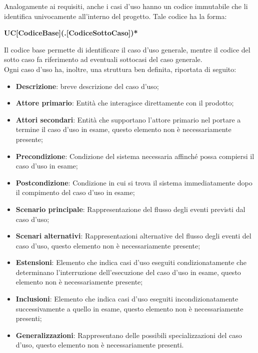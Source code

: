 Analogamente ai requisiti, anche i casi d'uso hanno un codice immutabile che li identifica univocamente all'interno del progetto. Tale codice ha la forma:
\begin{center}
    \textbf{UC[CodiceBase](.[CodiceSottoCaso])*}
\end{center}
Il codice base permette di identificare il caso d'uso generale, mentre il codice del sotto caso fa riferimento ad eventuali sottocasi del caso generale.\\
Ogni caso d'uso ha, inoltre, una struttura ben definita, riportata di seguito:
\begin{itemize}
    \item \textbf{Descrizione}: breve descrizione del caso d'uso;
    \item \textbf{Attore primario}: Entità che interagisce direttamente con il prodotto;
    \item \textbf{Attori secondari}: Entità che supportano l'attore primario nel portare a termine il caso d'uso in 
    esame, questo elemento non è necessariamente presente;
    \item \textbf{Precondizione}: Condizione del sistema necessaria affinché possa compiersi il caso d'uso in esame;
    \item \textbf{Postcondizione}: Condizione in cui si trova il sistema immediatamente dopo il compimento del caso 
    d'uso in esame;
    \item \textbf{Scenario principale}: Rappresentazione del flusso degli eventi previsti dal caso d'uso;
    \item \textbf{Scenari alternativi}: Rappresentazioni alternative del flusso degli eventi del caso d'uso, questo 
    elemento non è necessariamente presente;
    \item \textbf{Estensioni}: Elemento che indica casi d'uso eseguiti condizionatamente che determinano l'interruzione 
    dell'esecuzione del caso d'uso in esame, questo elemento non è necessariamente presente;
    \item \textbf{Inclusioni}: Elemento che indica casi d'uso eseguiti incondizionatamente successivamente a quello in 
    esame, questo elemento non è necessariamente presenti;
    \item \textbf{Generalizzazioni}: Rappresentano delle possibili specializzazioni del caso d'uso, questo elemento non è necessariamente presenti.
\end{itemize}

